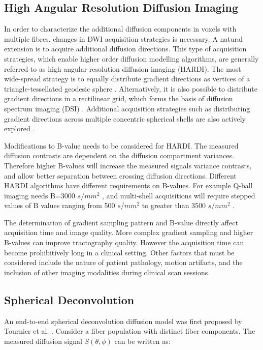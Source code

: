 \subsection{High Angular Resolution Diffusion Imaging}

In order to characterize the additional diffusion components in voxels with multiple fibres, changes in DWI acquisition strategies is necessary. A natural extension is to acquire additional diffusion directions. This type of acquisition strategies, which enable higher order diffusion modelling algorithms, are generally referred to as high angular resolution diffusion imaging (HARDI). The most wide-spread strategy is to equally distribute gradient directions as vertices of a triangle-tessellated geodesic sphere \cite{Frank2001}. Alternatively, it is also possible to distribute gradient directions in a rectilinear grid, which forms the basis of diffusion spectrum imaging (DSI) \cite{Wedeen2005}. Additional acquisition strategies such as distributing gradient directions across multiple concentric spherical shells are also actively explored \cite{Jeurissen2014a}. 

Modifications to B-value needs to be considered for HARDI. The measured diffusion contrasts are dependent on the diffusion compartment variances. Therefore higher B-values will increase the measured signals variance contrasts, and allow better separation between crossing diffusion directions. Different HARDI algorithms have different requirements on B-values. For example Q-ball imaging needs B=3000 $s/mm^2$ \cite{Descoteaux2007a}, and multi-shell acquisitions will require stepped values of B values ranging from 500  $s/mm^2 $  to greater than 3500  $s/mm^2 $ \cite{Tournier2013}. 

The determination of gradient sampling pattern and B-value directly affect acquisition time and image quality. More complex gradient sampling and higher B-values can improve tractography quality. However the acquisition time can become prohibitively long in a clinical setting. Other factors that must be considered include the nature of patient pathology, motion artifacts, and the inclusion of other imaging modalities during clinical scan sessions. 

\subsection{Spherical Deconvolution}

An end-to-end spherical deconvolution diffusion model was first proposed by Tournier et al. \cite{Tournier2004}. 
Consider a fiber population with distinct fiber components. The measured diffusion signal $S(\theta,\phi)$ can be written as:

